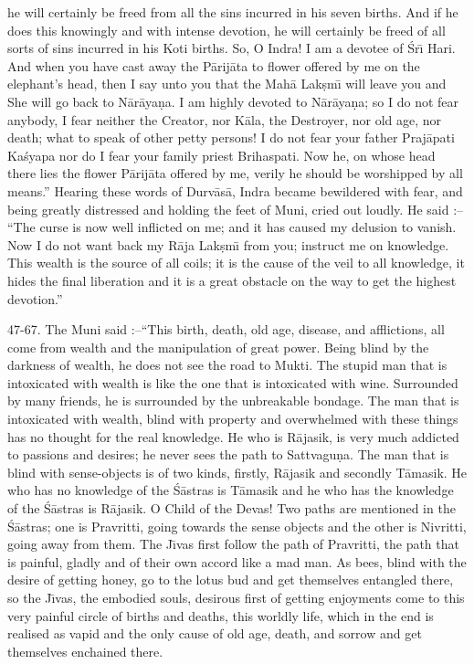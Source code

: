 he will certainly be freed from all the sins incurred in his seven births. And if he does this knowingly and with intense devotion, he will certainly be freed of all sorts of sins incurred in his Koti births. So, O Indra! I am a devotee of \'Sr\={\i} Hari. And when you have cast away the P\=arij\=ata to flower offered by me on the elephant's head, then I say unto you that the Mah\=a Lak\d{s}m\={\i} will leave you and She will go back to N\=ar\=aya\d{n}a. I am highly devoted to N\=ar\=aya\d{n}a; so I do not fear anybody, I fear neither the Creator, nor K\=ala, the Destroyer, nor old age, nor death; what to speak of other petty persons! I do not fear your father Praj\=apati Ka\'syapa nor do I fear your family priest Brihaspati. Now he, on whose head there lies the flower P\=arij\=ata offered by me, verily he should be worshipped by all means.'' Hearing these words of Durv\=as\=a, Indra became bewildered with fear, and being greatly distressed and holding the feet of Muni, cried out loudly. He said :-- ``The curse is now well inflicted on me; and it has caused my delusion to vanish. Now I do not want back my R\=aja Lak\d{s}m\={\i} from you; instruct me on knowledge. This wealth is the source of all coils; it is the cause of the veil to all knowledge, it hides the final liberation and it is a great obstacle on the way to get the highest devotion.''

47-67. The Muni said :--``This birth, death, old age, disease, and afflictions, all come from wealth and the manipulation of great power. Being blind by the darkness of wealth, he does not see the road to Mukti. The stupid man that is intoxicated with wealth is like the one that is intoxicated with wine. Surrounded by many friends, he is surrounded by the unbreakable bondage. The man that is intoxicated with wealth, blind with property and overwhelmed with these things has no thought for the real knowledge. He who is R\=ajasik, is very much addicted to passions and desires; he never sees the path to Sattvagu\d{n}a. The man that is blind with sense-objects is of two kinds, firstly, R\=ajasik and secondly T\=amasik. He who has no knowledge of the \'S\=astras is T\=amasik and he who has the knowledge of the \'S\=astras is R\=ajasik. O Child of the Devas! Two paths are mentioned in the \'S\=astras; one is Pravritti, going towards the sense objects and the other is Nivritti, going away from them. The J\={\i}vas first follow the path of Pravritti, the path that is painful, gladly and of their own accord like a mad man. As bees, blind with the desire of getting honey, go to the lotus bud and get themselves entangled there, so the J\={\i}vas, the embodied souls, desirous first of getting enjoyments come to this very painful circle of births and deaths, this worldly life, which in the end is realised as vapid and the only cause of old age, death, and sorrow and get themselves enchained there.

